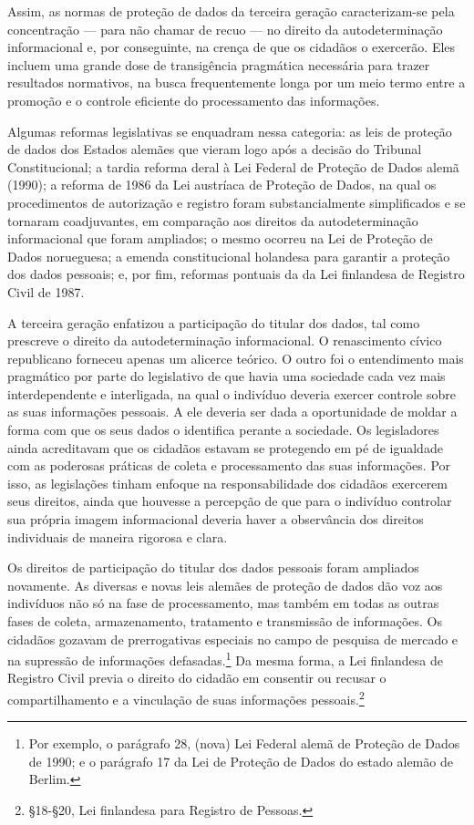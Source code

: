 Assim, as normas de proteção de dados da terceira geração
caracterizam-se pela concentração --- para não chamar de recuo --- no
direito da autodeterminação informacional e, por conseguinte, na crença
de que os cidadãos o exercerão. Eles incluem uma grande dose de
transigência pragmática necessária para trazer resultados normativos, na
busca frequentemente longa por um meio termo entre a promoção e o
controle eficiente do processamento das informações.

Algumas reformas legislativas se enquadram nessa categoria: as leis de
proteção de dados dos Estados alemães que vieram logo após a decisão do
Tribunal Constitucional; a tardia reforma deral à Lei Federal de
Proteção de Dados alemã (1990); a reforma de 1986 da Lei austríaca de
Proteção de Dados, na qual os procedimentos de autorização e registro
foram substancialmente simplificados e se tornaram coadjuvantes, em
comparação aos direitos da autodeterminação informacional que foram
ampliados; o mesmo ocorreu na Lei de Proteção de Dados norueguesa; a
emenda constitucional holandesa para garantir a proteção dos dados
pessoais; e, por fim, reformas pontuais da da Lei finlandesa de Registro
Civil de 1987.

A terceira geração enfatizou a participação do titular dos dados, tal
como prescreve o direito da autodeterminação informacional. O
renascimento cívico republicano forneceu apenas um alicerce teórico. O
outro foi o entendimento mais pragmático por parte do legislativo de que
havia uma sociedade cada vez mais interdependente e interligada, na qual
o indivíduo deveria exercer controle sobre as suas informações pessoais.
A ele deveria ser dada a oportunidade de moldar a forma com que os seus
dados o identifica perante a sociedade. Os legisladores ainda
acreditavam que os cidadãos estavam se protegendo em pé de igualdade com
as poderosas práticas de coleta e processamento das suas informações.
Por isso, as legislações tinham enfoque na responsabilidade dos cidadãos
exercerem seus direitos, ainda que houvesse a percepção de que para o
indivíduo controlar sua própria imagem informacional deveria haver a
observância dos direitos individuais de maneira rigorosa e clara.

Os direitos de participação do titular dos dados pessoais foram
ampliados novamente. As diversas e novas leis alemães de proteção de
dados dão voz aos indivíduos não só na fase de processamento, mas também
em todas as outras fases de coleta, armazenamento, tratamento e
transmissão de informações. Os cidadãos gozavam de prerrogativas
especiais no campo de pesquisa de mercado e na supressão de informações
defasadas.\footnote{Por exemplo, o parágrafo 28, (nova) Lei Federal
  alemã de Proteção de Dados de 1990; e o parágrafo 17 da Lei de
  Proteção de Dados do estado alemão de Berlim.} Da mesma forma, a Lei
finlandesa de Registro Civil previa o direito do cidadão em consentir ou
recusar o compartilhamento e a vinculação de suas informações
pessoais.\footnote{§18-§20, Lei finlandesa para Registro de Pessoas.}


